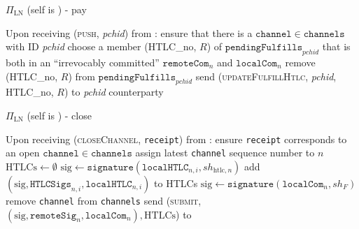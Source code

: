 \begin{protocolbox}{$\Pi_{\mathrm{LN}}$ (self is \alice) - pay}
\begin{algorithmic}[1]
    \State Upon receiving (\textsc{push}, \textit{pchid}) from \environment:
    \Indent
      \State ensure that there is a $\mathtt{channel} \in \mathtt{channels}$
      with ID \textit{pchid}
      \State choose a member (HTLC\_no, $R$) of
      $\mathtt{pendingFulfills}_{\mathit{pchid}}$ that is both in an
      ``irrevocably committed'' $\mathtt{remoteCom}_n$ and $\mathtt{localCom}_n$
      \State remove (HTLC\_no, $R$) from
      $\mathtt{pendingFulfills}_{\mathit{pchid}}$
      \State send (\textsc{updateFulfillHtlc}, \textit{pchid}, HTLC\_no, $R$) to
      \textit{pchid} counterparty
    \EndIndent
  \end{algorithmic}
\end{protocolbox}

\begin{protocolbox}{$\Pi_{\mathrm{LN}}$ (self is \alice) - close}
  \label{alg:protocol:close}
  \begin{algorithmic}[1]
    \State Upon receiving (\textsc{closeChannel}, \texttt{receipt}) from
    \environment:
    \Indent
      \State ensure \texttt{receipt} corresponds to an open $\mathtt{channel}
      \in \mathtt{channels}$
      \State assign latest \texttt{channel} sequence number to $n$
      \State $\mathrm{HTLCs} \gets \emptyset$
        \State $\mathrm{sig} \gets
        \mathtt{signature}\left(\mathtt{localHTLC}_{n, i}, sh_{\mathrm{htlc},
        n}\right)$
        \State add $\left(\mathrm{sig}, \mathtt{HTLCSigs}_{n, i},
        \mathtt{localHTLC}_{n, i}\right)$ to HTLCs
      \EndFor
      \State $\mathrm{sig} \gets \mathtt{signature}\left(\mathtt{localCom}_n,
      sh_F\right)$
      \State remove \texttt{channel} from \texttt{channels}
      \State send (\textsc{submit}, $\left(\mathrm{sig}, \mathtt{remoteSig}_n,
      \mathtt{localCom}_n\right), \mathrm{HTLCs}$) to \ledger
    \EndIndent
  \end{algorithmic}
\end{protocolbox}

